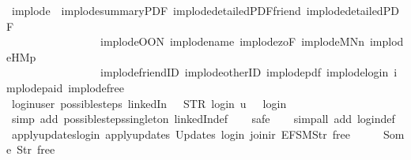 \begin{isabellebody}
\endisatagproof
{\isafoldproof}%
%
\isadelimproof
\isanewline
%
\endisadelimproof
\isanewline
{}\isamarkupfalse%
\ implode\ {\isacharequal}\ implode{\isacharunderscore}summaryPDF\ implode{\isacharunderscore}detailedPDF{\isacharunderscore}friend\ implode{\isacharunderscore}detailedPDF\isanewline
\ \ \ \ \ \ \ \ \ \ \ \ \ \ \ \ \ implode{\isacharunderscore}OON\ implode{\isacharunderscore}name\ implode{\isacharunderscore}{}zoF\ implode{\isacharunderscore}MNn{}\ implode{\isacharunderscore}HM{}p\isanewline
\ \ \ \ \ \ \ \ \ \ \ \ \ \ \ \ \ implode{\isacharunderscore}friendID\ implode{\isacharunderscore}otherID\ implode{\isacharunderscore}pdf\ implode{\isacharunderscore}login\ implode{\isacharunderscore}paid\ implode{\isacharunderscore}free\isanewline
\isanewline
{}\isamarkupfalse%
\ login{\isacharunderscore}user{\isacharcolon}\ {\isachardoublequoteopen}possible{\isacharunderscore}steps\ linkedIn\ {}\ {\isacharless}{\isachargreater}\ STR\ {\isacharprime}{\isacharprime}login{\isacharprime}{\isacharprime}\ {\isacharbrackleft}u{\isacharbrackright}\ {\isacharequal}\ {\isacharbraceleft}{\isacharbar}{\isacharparenleft}{}{\isacharcomma}\ login{\isacharparenright}{\isacharbar}{\isacharbraceright}{\isachardoublequoteclose}\isanewline
%
\isadelimproof
\ \ %
\endisadelimproof
%
\isatagproof
{}\isamarkupfalse%
\ {\isacharparenleft}simp\ add{\isacharcolon}\ possible{\isacharunderscore}steps{\isacharunderscore}singleton\ linkedIn{\isacharunderscore}def{\isacharparenright}\isanewline
\ \ \isamarkupfalse%
\ safe\isanewline
\ \ \isamarkupfalse%
\ {\isacharparenleft}simp{\isacharunderscore}all\ add{\isacharcolon}\ login{\isacharunderscore}def{\isacharparenright}%
\endisatagproof
{\isafoldproof}%
%
\isadelimproof
\isanewline
%
\endisadelimproof
\isanewline
{}\isamarkupfalse%
\ apply{\isacharunderscore}updates{\isacharunderscore}login{\isacharcolon}\ {\isachardoublequoteopen}apply{\isacharunderscore}updates\ {\isacharparenleft}Updates\ login{\isacharparenright}\ {\isacharparenleft}join{\isacharunderscore}ir\ {\isacharbrackleft}EFSM{\isachardot}Str\ {\isacharprime}{\isacharprime}free{\isacharprime}{\isacharprime}{\isacharbrackright}\ {\isacharless}{\isachargreater}{\isacharparenright}\ {\isacharless}{\isachargreater}\ {\isacharequal}\ {\isacharparenleft}{\isacharless}{\isachargreater}{\isacharparenleft}{}\ {\isachardollar}{\isacharcolon}{\isacharequal}\ Some\ {\isacharparenleft}Str\ {\isacharprime}{\isacharprime}free{\isacharprime}{\isacharprime}{\isacharparenright}{\isacharparenright}{\isacharparenright}{\isachardoublequoteclose}\isanewline

\end{isabellebody}
